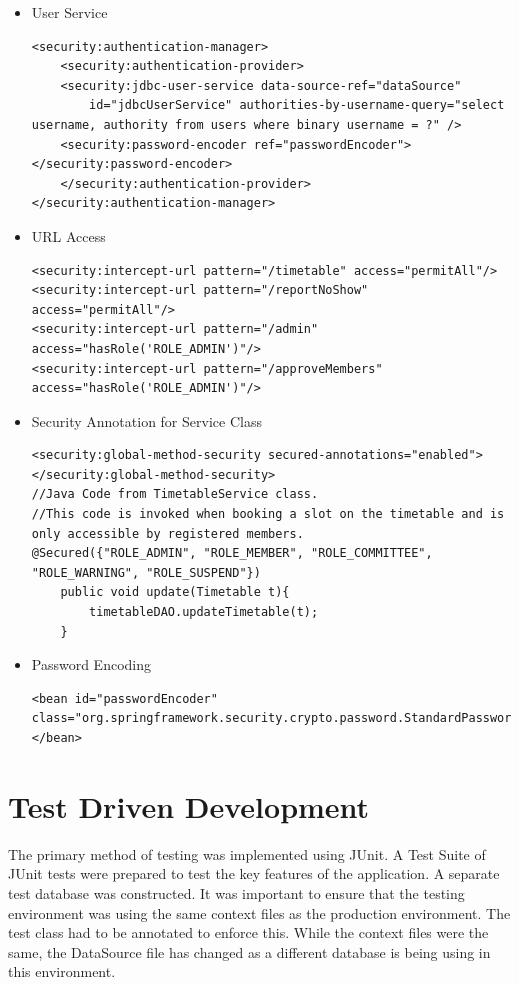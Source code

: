 \begin{itemize}
\item User Service
\begin{lstlisting}
<security:authentication-manager>	
	<security:authentication-provider>
	<security:jdbc-user-service data-source-ref="dataSource"
		id="jdbcUserService" authorities-by-username-query="select username, authority from users where binary username = ?" />
	<security:password-encoder ref="passwordEncoder"></security:password-encoder>
	</security:authentication-provider>
</security:authentication-manager>
\end{lstlisting}
\item URL Access
\begin{lstlisting}
<security:intercept-url pattern="/timetable" access="permitAll"/>
<security:intercept-url pattern="/reportNoShow" access="permitAll"/>
<security:intercept-url pattern="/admin" access="hasRole('ROLE_ADMIN')"/>
<security:intercept-url pattern="/approveMembers" access="hasRole('ROLE_ADMIN')"/>
\end{lstlisting}
\item Security Annotation for Service Class
\begin{lstlisting}
<security:global-method-security secured-annotations="enabled"></security:global-method-security>
//Java Code from TimetableService class. 
//This code is invoked when booking a slot on the timetable and is only accessible by registered members.
@Secured({"ROLE_ADMIN", "ROLE_MEMBER", "ROLE_COMMITTEE", "ROLE_WARNING", "ROLE_SUSPEND"})
	public void update(Timetable t){
		timetableDAO.updateTimetable(t);
	}
\end{lstlisting}
\item Password Encoding
\begin{lstlisting}
<bean id="passwordEncoder"
class="org.springframework.security.crypto.password.StandardPasswordEncoder">
</bean>
\end{lstlisting}
\end{itemize}

\section{Test Driven Development}

The primary method of testing was implemented using JUnit. A Test Suite of JUnit tests were prepared to test the key features of the application. A separate test database was constructed. It was important to ensure that the testing environment was using the same context files as the production environment. The test class had to be annotated to enforce this. While the context files were the same, the DataSource file has changed as a different database is being using in this environment.


